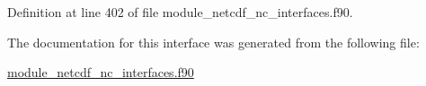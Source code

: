 Definition at line 402 of file module\+\_\+netcdf\+\_\+nc\+\_\+interfaces.\+f90.



The documentation for this interface was generated from the following file\+:\begin{DoxyCompactItemize}
\item 
\hyperlink{module__netcdf__nc__interfaces_8f90}{module\+\_\+netcdf\+\_\+nc\+\_\+interfaces.\+f90}\end{DoxyCompactItemize}
